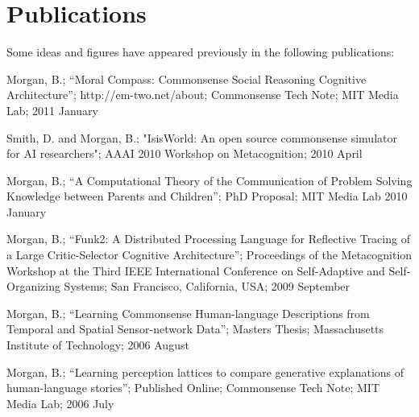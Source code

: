 \chapter*{Publications}
\enlargethispage*{2cm}

Some ideas and figures have appeared previously in the following publications:

\bigskip

\noindent Morgan, B.; ``Moral Compass: Commonsense Social Reasoning
 Cognitive Architecture''; http://em-two.net/about; Commonsense Tech
 Note; MIT Media Lab; 2011 January

\vspace{5mm}

\noindent Smith, D. and Morgan, B.; "IsisWorld: An open source
 commonsense simulator for AI researchers"; AAAI 2010 Workshop on
 Metacognition; 2010 April

\vspace{5mm}

\noindent Morgan, B.; ``A Computational Theory of the Communication of
 Problem Solving Knowledge between Parents and Children''; PhD
 Proposal; MIT Media Lab 2010 January

\vspace{5mm}

\noindent Morgan, B.; ``Funk2: A Distributed Processing Language for 
 Reflective Tracing of a Large Critic-Selector Cognitive
 Architecture''; Proceedings of the Metacognition Workshop at the
 Third IEEE International Conference on Self-Adaptive and
 Self-Organizing Systems; San Francisco, California, USA; 2009
 September

\vspace{5mm}

\noindent Morgan, B.; ``Learning Commonsense Human-language Descriptions
 from Temporal and Spatial Sensor-network Data''; Masters Thesis;
 Massachusetts Institute of Technology; 2006 August

\vspace{5mm}

\noindent Morgan, B.; ``Learning perception lattices to compare
 generative explanations of human-language stories''; Published
 Online; Commonsense Tech Note; MIT Media Lab; 2006 July

\vspace{5mm}

